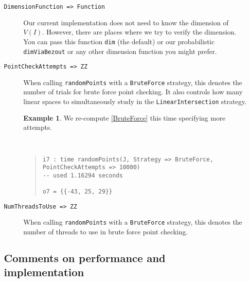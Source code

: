 \documentclass[11pt]{amsart}
\theoremstyle{definition}
\newtheorem{example}{Example}[section]
\begin{document}
\begin{description}
    \item[\tt DimensionFunction => Function]
        Our current implementation does not need to know the dimension of $V(I)$.  However, there are places where we try to verify the dimension.  You can pass this function {\tt dim} (the default) or our probabilistic {\tt dimViaBezout} or any other dimension function you might prefer.

    \item[\tt PointCheckAttempts => ZZ]

    When calling {\tt randomPoints} with a {\tt BruteForce} strategy, this denotes the number of trials for brute force point checking.  It also controls how many linear spaces to simultaneously study in the {\tt LinearIntersection} strategy.
    
    \begin{example}
        We re-compute \cref{BruteForce} this time specifying more attempts.
    {{\small\color{blue}
    ~~
    \begin{quote}
\begin{verbatim}    
i7 : time randomPoints(J, Strategy => BruteForce, PointCheckAttempts => 10000)
-- used 1.16294 seconds

o7 = {{-43, 25, 29}}
    \end{verbatim}%
\end{quote}\vspace{-1em}%
}}%
    \end{example}%
    
    \item[\tt NumThreadsToUse => ZZ]

    When calling {\tt randomPoints} with a {\tt BruteForce} strategy, this denotes the number of threads to use in brute force point checking.
    \end{description}

    \subsection{Comments on performance and implementation}
    \label{subsec.CommentOnPerformanceAndImplementation}
\end{document}
